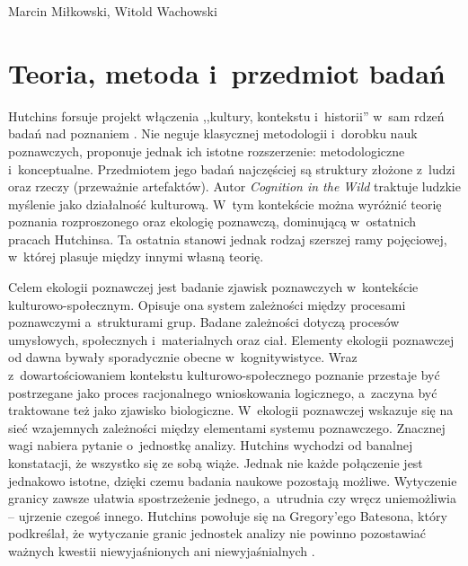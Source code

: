 \begin{artplenv2auth}{Marcin Miłkowski, Witold Wachowski}
\section{Teoria, metoda i~przedmiot badań}

Hutchins forsuje projekt włączenia ,,kultury, kontekstu i~historii'' w~sam rdzeń badań nad poznaniem
\parencite[][s.~2072]{hutchins_cognition_2001}. %
 Nie neguje klasycznej metodologii i~dorobku nauk poznawczych, proponuje jednak ich istotne rozszerzenie: metodologiczne i~konceptualne. Przedmiotem jego badań najczęściej są struktury złożone z~ludzi oraz rzeczy (przeważnie artefaktów). Autor \textit{Cognition in the Wild} traktuje ludzkie myślenie jako działalność kulturową. W~tym kontekście można wyróżnić teorię poznania rozproszonego oraz ekologię poznawczą, dominującą w~ostatnich pracach Hutchinsa. Ta ostatnia stanowi jednak rodzaj szerszej ramy pojęciowej, w~której plasuje między innymi własną teorię.

Celem ekologii poznawczej jest badanie zjawisk poznawczych w~kontekście kulturowo-społecznym. Opisuje ona system zależności między procesami poznawczymi a~strukturami grup. Badane zależności dotyczą procesów umysłowych, społecznych i~materialnych oraz ciał. Elementy ekologii poznawczej od dawna bywały sporadycznie obecne w~kognitywistyce. Wraz z~dowartościowaniem kontekstu kulturowo-społecznego poznanie przestaje być postrzegane jako proces racjonalnego wnioskowania logicznego, a~zaczyna być traktowane też jako zjawisko biologiczne. W~ekologii poznawczej wskazuje się na sieć wzajemnych zależności między elementami systemu poznawczego. Znacznej wagi nabiera pytanie o~jednostkę analizy. Hutchins wychodzi od banalnej konstatacji, że wszystko się ze sobą wiąże. Jednak nie każde połączenie jest jednakowo istotne, dzięki czemu badania naukowe pozostają możliwe. Wytyczenie granicy zawsze ułatwia spostrzeżenie jednego, a~utrudnia czy wręcz uniemożliwia -- ujrzenie czegoś innego. Hutchins powołuje się na Gregory'ego Batesona, który podkreślał, że wytyczanie granic jednostek analizy nie powinno pozostawiać ważnych kwestii niewyjaśnionych ani niewyjaśnialnych
\parencites{hutchins_cognivite_2008}[][]{hutchins_cognitive_2010}.%



\end{artplenv2auth}

